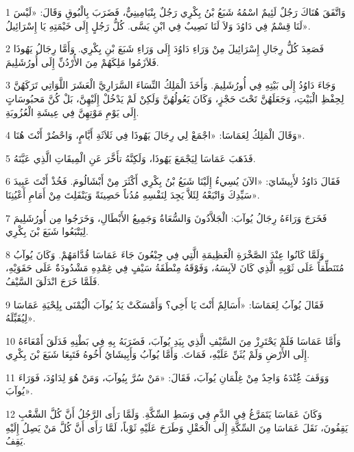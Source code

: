 \par 1 وَاتَّفَقَ هُنَاكَ رَجُلٌ لَئِيمٌ اسْمُهُ شَبَعُ بْنُ بِكْرِي رَجُلٌ بِنْيَامِينِيٌّ، فَضَرَبَ بِالْبُوقِ وَقَالَ: «لَيْسَ لَنَا قِسْمٌ فِي دَاوُدَ وَلاَ لَنَا نَصِيبٌ فِي ابْنِ يَسَّى. كُلُّ رَجُلٍ إِلَى خَيْمَتِهِ يَا إِسْرَائِيلُ».
\par 2 فَصَعِدَ كُلُّ رِجَالِ إِسْرَائِيلَ مِنْ وَرَاءِ دَاوُدَ إِلَى وَرَاءِ شَبَعَ بْنِ بِكْرِي. وَأَمَّا رِجَالُ يَهُوذَا فَلاَزَمُوا مَلِكَهُمْ مِنَ الأُرْدُنِّ إِلَى أُورُشَلِيمَ.
\par 3 وَجَاءَ دَاوُدُ إِلَى بَيْتِهِ فِي أُورُشَلِيمَ. وَأَخَذَ الْمَلِكُ النِّسَاءَ السَّرَارِيَّ الْعَشَرَ اللَّوَاتِي تَرَكَهُنَّ لِحِفْظِ الْبَيْتِ، وَجَعَلَهُنَّ تَحْتَ حَجْزٍ، وَكَانَ يَعُولُهُنَّ وَلَكِنْ لَمْ يَدْخُلْ إِلَيْهِنَّ، بَلْ كُنَّ مَحبُوسَاتٍ إِلَى يَوْمِ مَوْتِهِنَّ فِي عِيشَةِ الْعُزُوبَةِ.
\par 4 وَقَالَ الْمَلِكُ لِعَمَاسَا: «اجْمَعْ لِي رِجَالَ يَهُوذَا فِي ثَلاَثَةِ أَيَّامٍ، وَاحْضُرْ أَنْتَ هُنَا».
\par 5 فَذَهَبَ عَمَاسَا لِيَجْمَعَ يَهُوذَا، وَلَكِنَّهُ تأَخَّرَ عَنِ الْمِيقَاتِ الَّذِي عَيَّنَهُ.
\par 6 فَقَالَ دَاوُدُ لأَبِيشَايَ: «الآنَ يُسِيءُ إِلَيْنَا شَبَعُ بْنُ بِكْرِي أَكْثَرَ مِنْ أَبْشَالُومَ. فَخُذْ أَنْتَ عَبِيدَ سَيِّدِكَ وَاتْبَعْهُ لِئَلاَّ يَجِدَ لِنَفْسِهِ مُدُناً حَصِينَةً وَيَنْفَلِتَ مِنْ أَمَامِ أَعْيُنِنَا».
\par 7 فَخَرَجَ وَرَاءَهُ رِجَالُ يُوآبَ: الْجَلاَّدُونَ وَالسُّعَاةُ وَجَمِيعُ الأَبْطَالِ، وَخَرَجُوا مِن أُورُشَلِيمَ لِيَتْبَعُوا شَبَعَ بْنَ بِكْرِي.
\par 8 وَلَمَّا كَانُوا عِنْدَ الصَّخْرَةِ الْعَظِيمَةِ الَّتِي فِي جِبْعُونَ جَاءَ عَمَاسَا قُدَّامَهُمْ. وَكَانَ يُوآبُ مُتَنَطِّقاً عَلَى ثَوْبِهِ الَّذِي كَانَ لاَبِسَهُ، وَفَوْقَهُ مِنْطَقَةُ سَيْفٍ فِي غِمْدِهِ مَشْدُودَةٌ عَلَى حَقَوَيْهِ، فَلَمَّا خَرَجَ انْدَلَقَ السَّيْفُ.
\par 9 فَقَالَ يُوآبُ لِعَمَاسَا: «أَسَالِمٌ أَنْتَ يَا أَخِي؟ وَأَمْسَكَتْ يَدُ يُوآبَ الْيُمْنَى بِلِحْيَةِ عَمَاسَا لِيُقَبِّلَهُ».
\par 10 وَأَمَّا عَمَاسَا فَلَمْ يَحْتَرِزْ مِنَ السَّيْفِ الَّذِي بِيَدِ يُوآبَ، فَضَرَبَهُ بِهِ فِي بَطْنِهِ فَدَلَقَ أَمْعَاءَهُ إِلَى الأَرْضِ وَلَمْ يُثَنِّ عَلَيْهِ، فَمَاتَ. وَأَمَّا يُوآبُ وَأَبِيشَايُ أَخُوهُ فَتَبِعَا شَبَعَ بْنَ بِكْرِي.
\par 11 وَوَقَفَ عَُِنْدَهُ وَاحِدٌ مِنْ غِلْمَانِ يُوآبَ، فَقَالَ: «مَنْ سُرَّ بِيُوآبَ، وَمَنْ هُوَ لِدَاوُدَ، فَوَرَاءَ يُوآبَ».
\par 12 وَكَانَ عَمَاسَا يَتَمَرَّغُ فِي الدَّمِ فِي وَسَطِ السِّكَّةِ. وَلَمَّا رَأَى الرَّجُلُ أَنَّ كُلَّ الشَّعْبِ يَقِفُونَ، نَقَلَ عَمَاسَا مِنَ السِّكَّةِ إِلَى الْحَقْلِ وَطَرَحَ عَلَيْهِ ثَوْباً، لَمَّا رَأَى أَنَّ كُلَّ مَنْ يَصِلُ إِلَيْهِ يَقِفُ.
